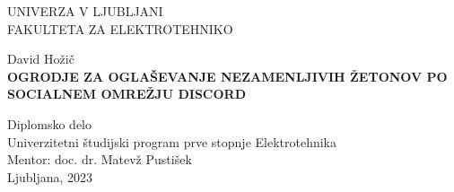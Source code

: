 \begin{titlepage}
    \thispagestyle{empty} 
    \begin{center}
    {\large 
    UNIVERZA V LJUBLJANI\\
    FAKULTETA ZA ELEKTROTEHNIKO\\
    }

    \vspace{3cm}
    {\LARGE David Hožič}\\

    \vspace{2cm}
    {\textbf{\LARGE OGRODJE ZA OGLAŠEVANJE NEZAMENLJIVIH ŽETONOV PO SOCIALNEM OMREŽJU DISCORD }}

    \vspace{2cm}
    {\Large Diplomsko delo}\\
    
    \vspace{1cm}
    {\Large Univerzitetni študijski program prve stopnje Elektrotehnika}\\

    \vspace{2cm}
    {\Large Mentor: doc. dr. Matevž Pustišek}\\
    \vfill
    {\Large Ljubljana, 2023}
    \end{center}
    \ \thispagestyle{empty}

\end{titlepage}



